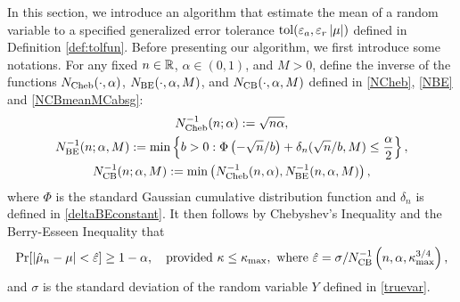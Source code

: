 \documentclass{iitthesis}
\theoremstyle{definition}
\begin{document}
\label{sec:algmeanMCg}

In this section, we introduce an algorithm that estimate the mean of a random variable to a specified generalized error tolerance $\operatorname{tol}(\varepsilon_a, \varepsilon_r\left \lvert \mu \right \rvert)$ defined in Definition \ref{def:tolfun}. Before presenting our algorithm, we first introduce some notations. 
For any fixed $n \in \mathbb{R}$, $\alpha \in (0,1)$, and $M>0$, define the inverse of the functions $N_{\text{Cheb}}(\cdot,\alpha)$, $N_{\text{BE}}(\cdot,\alpha,M)$, and $N_{\text{CB}}(\cdot,\alpha,M)$ defined in \eqref{NCheb}, \eqref{NBE} and \eqref{NCBmeanMCabsg}:
\begin{gather}\label{NCinv*}
N_{\text{Cheb}}^{-1}(n;\alpha) := \sqrt{n \alpha}, \\
\label{NBinv*}
N_{\text{BE}}^{-1}(n;\alpha,M) := \min \left \{ b>0 : \Phi\left(-\sqrt{n}/b  \right)+\delta_n(\sqrt{n}/b,M)
\le \frac{\alpha}{2} \right \}, \\
\label{NCBinv}
N_{\text{CB}}^{-1}(n;\alpha,M) := \min\left(N_{\text{Cheb}}^{-1}(n,\alpha),N_{\text{BE}}^{-1}(n,\alpha,M)\right),
\end{gather}
where $\Phi$ is the standard Gaussian cumulative distribution function and $\delta_n$ is defined in \eqref{deltaBEconstant}. It then follows by Chebyshev's Inequality and the Berry-Esseen Inequality that 
\begin{equation*}
\Pr[\left \lvert \hat{\mu}_n -\mu \right \rvert<\hat{\varepsilon}] \geq 1-\alpha, \quad \text{provided } \kappa\leq\kappa_{\max}, \text{ where }\hat{\varepsilon}=\sigma/N_{\text{CB}}^{-1}\left(n,\alpha,\kappa_{\max}^{3/4}\right), 
\end{equation*} 
and $\sigma$ is the standard deviation of the random variable $Y$ defined in \eqref{truevar}.  
\end{document}
